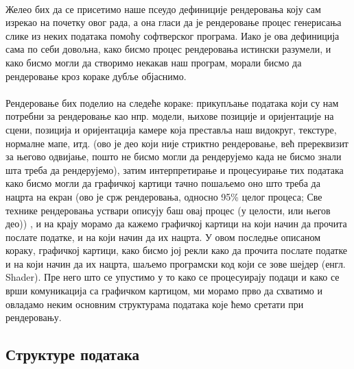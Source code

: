 \documentclass[12pt]{article}
\begin{document}
	\paragraph{}
	Желео бих да се присетимо наше псеудо дефиниције рендеровања коју сам изрекао на почетку овог рада, а она гласи да је рендеровање процес генерисања слике из неких података помоћу софтверског програма. Иако је ова дефиниција сама по себи довољна, како бисмо процес рендеровања истински разумели, и како бисмо могли да створимо некакав наш програм, морали бисмо да рендеровање кроз кораке дубље објаснимо.
	\paragraph{}
	Рендеровање бих поделио на следеће кораке: прикупљање података који су нам потребни за рендеровање као нпр. модели, њихове позиције и оријентације на сцени, позиција и оријентација камере која преставља наш видокруг, текстуре, нормалне мапе, итд. (ово је део који није стриктно рендеровање, већ пререквизит за његово одвијање, пошто не бисмо могли да рендерујемо када не бисмо знали шта треба да рендерујемо), затим интерпретирање и процесуирање тих података како бисмо могли да графичкој картици тачно пошаљемо оно што треба да нацрта на екран (ово је срж рендеровања, односно 95\% целог процеса; Све технике рендеровања уствари описују баш овај процес (у целости, или његов део)) ,  и на крају морамо да кажемо графичкој картици на који начин да прочита послате податке, и на који начин да их нацрта. У овом последње описаном кораку, графичкој картици, како бисмо јој рекли како да прочита послате податке и на који начин да их нацрта,  шаљемо програмски код који се зове шејдер (енгл. Shader). Пре него што се упустимо у то како се процесуирају подаци и како се врши комуникација са графичком картицом, ми морамо прво да схватимо и овладамо неким основним структурама података које ћемо сретати при рендеровању.
	
	\subsection{Структуре података}
	
\end{document}
